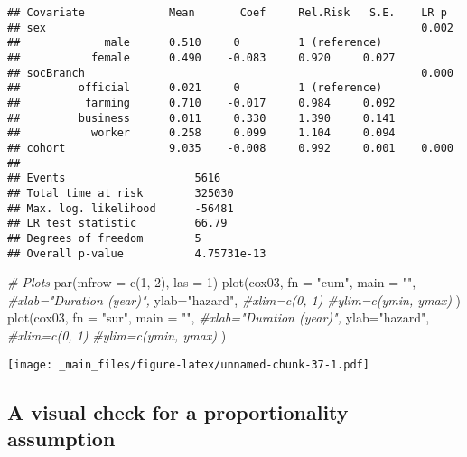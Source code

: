 \documentclass[
]{book}
\newenvironment{Shaded}{\begin{snugshade}}{\end{snugshade}}
\newcommand{\AttributeTok}[1]{\textcolor[rgb]{0.77,0.63,0.00}{#1}}
\newcommand{\CommentTok}[1]{\textcolor[rgb]{0.56,0.35,0.01}{\textit{#1}}}
\newcommand{\DecValTok}[1]{\textcolor[rgb]{0.00,0.00,0.81}{#1}}
\newcommand{\FunctionTok}[1]{\textcolor[rgb]{0.00,0.00,0.00}{#1}}
\newcommand{\NormalTok}[1]{#1}
\newcommand{\StringTok}[1]{\textcolor[rgb]{0.31,0.60,0.02}{#1}}
\begin{document}
\begin{verbatim}
## Covariate             Mean       Coef     Rel.Risk   S.E.    LR p
## sex                                                          0.002 
##             male      0.510     0         1 (reference)
##           female      0.490    -0.083     0.920     0.027
## socBranch                                                    0.000 
##         official      0.021     0         1 (reference)
##          farming      0.710    -0.017     0.984     0.092
##         business      0.011     0.330     1.390     0.141
##           worker      0.258     0.099     1.104     0.094
## cohort                9.035    -0.008     0.992     0.001    0.000 
## 
## Events                    5616 
## Total time at risk        325030 
## Max. log. likelihood      -56481 
## LR test statistic         66.79 
## Degrees of freedom        5 
## Overall p-value           4.75731e-13
\end{verbatim}

\begin{Shaded}
\begin{Highlighting}[]
\CommentTok{\# Plots}
\FunctionTok{par}\NormalTok{(}\AttributeTok{mfrow =} \FunctionTok{c}\NormalTok{(}\DecValTok{1}\NormalTok{, }\DecValTok{2}\NormalTok{), }\AttributeTok{las =} \DecValTok{1}\NormalTok{)}
\FunctionTok{plot}\NormalTok{(cox03, }
     \AttributeTok{fn =} \StringTok{"cum"}\NormalTok{, }\AttributeTok{main =} \StringTok{""}\NormalTok{, }
     \CommentTok{\#xlab="Duration (year)", }
     \AttributeTok{ylab=}\StringTok{"hazard"}\NormalTok{,}
     \CommentTok{\#xlim=c(0, 1) }
     \CommentTok{\#ylim=c(ymin, ymax)}
\NormalTok{     )}
\FunctionTok{plot}\NormalTok{(cox03, }
     \AttributeTok{fn =} \StringTok{"sur"}\NormalTok{, }\AttributeTok{main =} \StringTok{""}\NormalTok{, }
     \CommentTok{\#xlab="Duration (year)", }
     \AttributeTok{ylab=}\StringTok{"hazard"}\NormalTok{,}
     \CommentTok{\#xlim=c(0, 1) }
     \CommentTok{\#ylim=c(ymin, ymax)}
\NormalTok{     )}
\end{Highlighting}
\end{Shaded}

\texttt{[image: \_main\_files/figure-latex/unnamed-chunk-37-1.pdf]}

\hypertarget{a-visual-check-for-a-proportionality-assumption}{%
\subsection{A visual check for a proportionality assumption}\label{a-visual-check-for-a-proportionality-assumption}}
\end{document}
